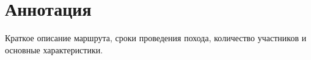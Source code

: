 \chapter*{Аннотация}

Краткое описание маршрута, сроки проведения похода,
количество участников и основные характеристики.